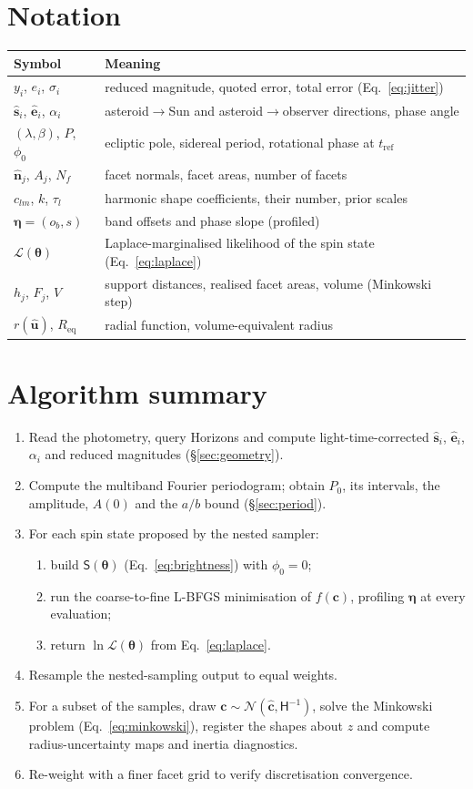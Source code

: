 \documentclass[11pt,a4paper]{article}
\theoremstyle{remark}
\newcommand{\vect}[1]{\bm{#1}}
\newcommand{\uv}[1]{\hat{\bm{#1}}}
\newcommand{\Req}{R_{\mathrm{eq}}}
\begin{document}
\section{Notation}
\begin{tabular}{@{}ll@{}}
\toprule
Symbol & Meaning\\
\midrule
$y_i$, $e_i$, $\sigma_i$ & reduced magnitude, quoted error, total error (Eq.~\ref{eq:jitter})\\
$\uv s_i$, $\uv e_i$, $\alpha_i$ & asteroid$\to$Sun and asteroid$\to$observer directions, phase angle\\
$(\lambda,\beta)$, $P$, $\phi_0$ & ecliptic pole, sidereal period, rotational phase at $t_{\mathrm{ref}}$\\
$\uv n_j$, $A_j$, $N_f$ & facet normals, facet areas, number of facets\\
$c_{lm}$, $k$, $\tau_l$ & harmonic shape coefficients, their number, prior scales\\
$\vect\eta=(o_b,s)$ & band offsets and phase slope (profiled)\\
$\mathcal L(\vect\theta)$ & Laplace-marginalised likelihood of the spin state (Eq.~\ref{eq:laplace})\\
$h_j$, $F_j$, $V$ & support distances, realised facet areas, volume (Minkowski step)\\
$r(\uv u)$, $\Req$ & radial function, volume-equivalent radius\\
\bottomrule
\end{tabular}

\section{Algorithm summary}
\begin{enumerate}[leftmargin=*]
\item Read the photometry, query Horizons and compute light-time-corrected $\uv s_i$, $\uv e_i$,
  $\alpha_i$ and reduced magnitudes (\S\ref{sec:geometry}).
\item Compute the multiband Fourier periodogram; obtain $P_0$, its intervals, the amplitude, $A(0)$ and
  the $a/b$ bound (\S\ref{sec:period}).
\item For each spin state proposed by the nested sampler:
  \begin{enumerate}[nosep]
  \item build $\mathsf S(\vect\theta)$ (Eq.~\ref{eq:brightness}) with $\phi_0=0$;
  \item run the coarse-to-fine L-BFGS minimisation of $f(\vect c)$, profiling $\vect\eta$ at every
    evaluation;
  \item return $\ln\mathcal L(\vect\theta)$ from Eq.~\eqref{eq:laplace}.
  \end{enumerate}
\item Resample the nested-sampling output to equal weights.
\item For a subset of the samples, draw $\vect c\sim\mathcal N(\hat{\vect c},\mathsf H^{-1})$, solve the
  Minkowski problem (Eq.~\ref{eq:minkowski}), register the shapes about $z$ and compute
  radius-uncertainty maps and inertia diagnostics.
\item Re-weight with a finer facet grid to verify discretisation convergence.
\end{enumerate}
\end{document}
